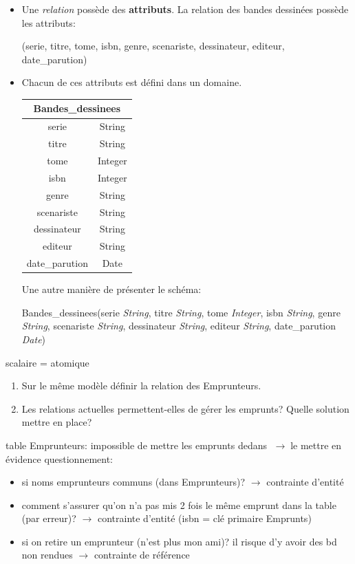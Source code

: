 \documentclass[a4paper,11pt]{article}
\begin{document}
\begin{Form}
\begin{itemize}
\begin{center}
\end{center}
\item Une \emph{relation} possède des \textbf{attributs}. La relation des bandes dessinées possède les attributs:
\begin{center}
(serie, titre, tome, isbn, genre, scenariste, dessinateur, editeur, date\_parution)
\end{center}
\item Chacun de ces attributs est défini dans un domaine.
\begin{center}
\begin{tabular}{|cc|}
\hline 
\multicolumn{2}{|c|}{Bandes\_dessinees} \\ 
\hline 
serie & String \\ 
titre & String \\ 
tome & Integer \\ 
isbn & Integer \\ 
genre & String \\ 
scenariste & String \\ 
dessinateur & String \\ 
editeur & String \\ 
date\_parution & Date \\ 
\hline 
\end{tabular} 
\end{center}
Une autre manière de présenter le schéma:

Bandes\_dessinees(serie \emph{String}, titre \emph{String}, tome \emph{Integer}, isbn \emph{String}, genre \emph{String}, scenariste \emph{String}, dessinateur \emph{String}, editeur \emph{String}, date\_parution \emph{Date})
\end{itemize}
\begin{commentprof}
scalaire = atomique
\end{commentprof}
\begin{activite}
\begin{enumerate}
\item Sur le même modèle définir la relation des Emprunteurs.
\item Les relations actuelles permettent-elles de gérer les emprunts? Quelle solution mettre en place?
\end{enumerate}
\end{activite}
\begin{commentprof}
table Emprunteurs: impossible de mettre les emprunts dedans $\;\rightarrow\;$le mettre en évidence
questionnement:
\begin{itemize}
\item si noms emprunteurs communs (dans Emprunteurs)? $\rightarrow$ contrainte d'entité
\item comment s'assurer qu'on n'a pas mis 2 fois le même emprunt dans la table (par erreur)? $\rightarrow$ contrainte d'entité (isbn = clé primaire Emprunts)
\item si on retire un emprunteur (n'est plus mon ami)? il risque d'y avoir des bd non rendues $\rightarrow$ contrainte de référence
\end{itemize}
\end{commentprof}

\end{Form}
\end{document}
